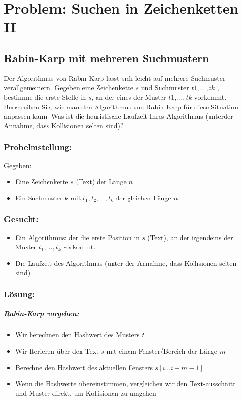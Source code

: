 \section{Problem: Suchen in Zeichenketten II}

\subsection{Rabin-Karp mit mehreren Suchmustern}\label{Rabin-Karp-suchmuster}
Der Algorithmus von Rabin-Karp lässt sich leicht auf mehrere Suchmuster
verallgemeinern. Gegeben eine Zeichenkette $s$ und Suchmuster $t1 , \dots , tk$ , bestimme die erste Stelle in $s$, an der eines der Muster $t1, \dots , tk$ vorkommt. Beschreiben Sie, wie man den Algorithmus von Rabin-Karp für diese Situation anpassen kann. Was ist die heuristische Laufzeit Ihres Algorithmus (unterder Annahme, dass Kollisionen selten sind)?

\subsubsection{Probelmstellung:}
Gegeben:
\begin{itemize}
	\item Eine Zeichenkette $s$ (Text) der Länge $n$
	\item Ein Suchmuster $k$ mit $t_1, t_2, \dots , t_k$ der gleichen Länge $m$
\end{itemize}

\subsubsection{Gesucht:}
\begin{itemize}
	\item Ein Algorithmus: der die erste Position in $s$ (Text), an der irgendeins der Muster $t_1, \dots, t_k$ vorkommt.
	\item Die Laufzeit des Algorithmus (unter der Annahme, dass Kollisionen selten sind)
\end{itemize}

\subsubsection{Lösung:}
\subparagraph{Rabin-Karp vorgehen:}
\begin{itemize}
	\item Wir berechnen den Hashwert des Musters $t$
	\item Wir Iterieren über den Text $s$ mit einem Fenster/Bereich der Länge $m$
	\item Berechne den Hashwert des aktuellen Fensters $s[i \dots i+m-1]$
	\item Wenn die Hashwerte übereinstimmen, vergleichen wir den Text-ausschnitt und Muster direkt, um Kollisionen zu umgehen
\end{itemize}


